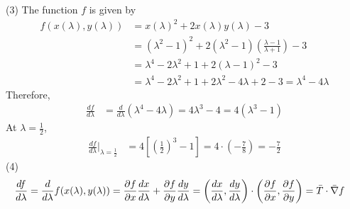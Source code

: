 \documentclass[12pt]{article}
\begin{document}
(3)
The function $f$ is given by
\begin{align*}
f(x(\lambda),y(\lambda)) &= x(\lambda)^2 + 2x(\lambda)y(\lambda) - 3\\[1em]
&= \left(\lambda^2 - 1 \right)^2 + 2 \left(\lambda^2 - 1 \right) \left(\frac{\lambda - 1}{\lambda + 1} \right) - 3 \\[1em]
&=  \lambda^4 - 2 \lambda^2 + 1 + 2 \left(\lambda - 1 \right)^2 - 3\\[1em]
&=  \lambda^4 - 2 \lambda^2 + 1 + 2 \lambda^2 - 4 \lambda + 2  - 3 = \lambda^4 - 4 \lambda
\end{align*}
Therefore,
\begin{align*}
\frac{d f}{d \lambda} &= \frac{d}{d \lambda}  \left( \lambda^4 - 4 \lambda \right) = 4 \lambda^3 - 4 = 4\left(\lambda^3 - 1\right)
\end{align*}
At $\lambda = \frac{1}{2}$,
\begin{align*}
\frac{d f}{d \lambda}\bigg|_{\lambda = \frac{1}{2}} &= 4\left[\left(\frac{1}{2}\right)^3 - 1\right] = 4 \cdot \left(- \frac{7}{8} \right) = - \frac{7}{2}
\end{align*}
(4)
\begin{align*}
\frac{d f}{d \lambda} &= \frac{d}{d \lambda} f(x(\lambda),y(\lambda)) = \frac{\partial f}{\partial x} \frac{d x}{d \lambda} + \frac{\partial f}{\partial y} \frac{d y}{d \lambda} = \left( \frac{d x}{d \lambda}, \frac{d y}{d \lambda}\right) \cdot \left( \frac{\partial f}{\partial x}, \frac{\partial f}{\partial y}\right) = \Bar{T} \cdot \Bar{\nabla} f
\end{align*}
\end{document}
